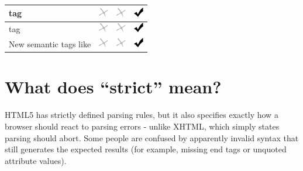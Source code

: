 \documentclass[a4paper,12pt]{sphinxmanual}
\begin{document}
\begin{tabulary}{\linewidth}{|p{9cm}|p{2cm}|p{2cm}|p{2cm}|}
 tag
 & 
\includegraphics{no.png}
 & 
\includegraphics{no.png}
 & 
\includegraphics{yes.png}
\\\hline

 tag
 & 
\includegraphics{no.png}
 & 
\includegraphics{no.png}
 & 
\includegraphics{yes.png}
\\\hline

New semantic tags like 
 & 
\includegraphics{no.png}
 & 
\includegraphics{no.png}
 & 
\includegraphics{yes.png}
\\\hline
\end{tabulary}



\section{What does ``strict'' mean?}
\label{htmlfaq:what-does-strict-mean}
HTML5 has strictly defined parsing rules, but it also specifies exactly
how a browser should react to parsing errors - unlike XHTML, which simply
states parsing should abort. Some people are confused by apparently
invalid syntax that still generates the expected results (for example,
missing end tags or unquoted attribute values).
\end{document}
